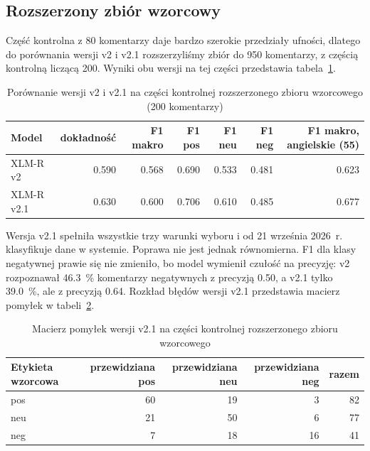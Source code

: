\subsection{Rozszerzony zbiór wzorcowy}
\label{sec:eval-gold-v3}

Część kontrolna z 80 komentarzy daje bardzo szerokie przedziały ufności, dlatego do porównania wersji v2 i v2.1 rozszerzyliśmy zbiór do 950 komentarzy, z częścią kontrolną liczącą 200.
Wyniki obu wersji na tej części przedstawia tabela~\ref{tab:gold-v3}.

\begin{table}[hbp]
  \caption{Porównanie wersji v2 i v2.1 na części kontrolnej rozszerzonego zbioru wzorcowego (200 komentarzy)}
  \label{tab:gold-v3}
  \centering
  \small
  \begin{tabular}{|l|r|r|r|r|r|r|}
    \hline
    Model & dokładność & F1 makro & F1 pos & F1 neu & F1 neg & F1 makro, angielskie (55) \\
    \hline
    XLM-R v2   & \num{0.590} & \num{0.568} & \num{0.690} & \num{0.533} & \num{0.481} & \num{0.623} \\
    \hline
    XLM-R v2.1 & \num{0.630} & \num{0.600} & \num{0.706} & \num{0.610} & \num{0.485} & \num{0.677} \\
    \hline
  \end{tabular}
\end{table}

Wersja v2.1 spełniła wszystkie trzy warunki wyboru i od 21 września 2026~r. klasyfikuje dane w systemie.
Poprawa nie jest jednak równomierna.
F1 dla klasy negatywnej prawie się nie zmieniło, bo model wymienił czułość na precyzję: v2 rozpoznawał \qty{46.3}{\percent} komentarzy negatywnych z precyzją \num{0.50}, a v2.1 tylko \qty{39.0}{\percent}, ale z precyzją \num{0.64}.
Rozkład błędów wersji v2.1 przedstawia macierz pomyłek w tabeli~\ref{tab:confusion-v21}.

\begin{table}[hbp]
  \caption{Macierz pomyłek wersji v2.1 na części kontrolnej rozszerzonego zbioru wzorcowego}
  \label{tab:confusion-v21}
  \centering
  \small
  \begin{tabular}{|l|r|r|r|r|}
    \hline
    Etykieta wzorcowa & przewidziana pos & przewidziana neu & przewidziana neg & razem \\
    \hline
    pos               & 60               & 19               & 3                & 82    \\
    \hline
    neu               & 21               & 50               & 6                & 77    \\
    \hline
    neg               & 7                & 18               & 16               & 41    \\
    \hline
  \end{tabular}
\end{table}

